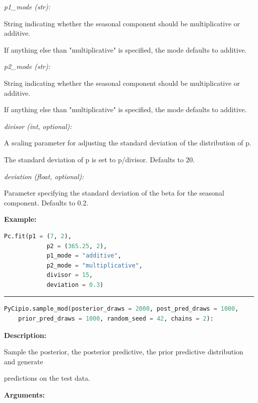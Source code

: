 \documentclass{article}
\begin{document}
\indent \indent \textit{p1\_mode (str):} 

\indent \indent \indent String indicating whether the seasonal component should be
multiplicative or additive. 

\indent \indent \indent If anything else than "multiplicative" is specified,
the mode defaults to additive.

\indent \indent \textit{p2\_mode (str):} 

\indent \indent \indent String indicating whether the seasonal component should be
multiplicative or additive. 

\indent \indent \indent If anything else than "multiplicative" is specified,
the mode defaults to additive.

\indent \indent \textit{divisor (int, optional):} 

\indent \indent \indent A scaling parameter for adjusting the standard deviation of the distribution
of p. 

\indent \indent \indent The standard deviation of p is set to p/divisor. Defaults to 20. 

\indent \indent \textit{deviation (float, optional):} 

\indent \indent \indent Parameter specifying the standard deviation of the beta for the seasonal
component. Defaults to 0.2.

\indent \textbf{Example:}

\begin{lstlisting}[language=Python]
        Pc.fit(p1 = (7, 2), 
            p2 = (365.25, 2), 
            p1_mode = "additive", 
            p2_mode = "multiplicative", 
            divisor = 15, 
            deviation = 0.3)    
\end{lstlisting}


\hrule

\begin{lstlisting}[language=Python]
    PyCipio.sample_mod(posterior_draws = 2000, post_pred_draws = 1000, 
    prior_pred_draws = 1000, random_seed = 42, chains = 2):
\end{lstlisting}

\indent \textbf{Description:} 

\indent \indent Sample the posterior, the posterior predictive, the prior predictive distribution and generate 

\indent \indent predictions on the test data.

\indent \textbf{Arguments:}
\end{document}
